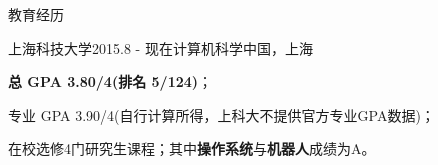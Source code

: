 \documentclass{resume} %
\begin{document}

\begin{rSection}{教育经历}

\begin{rSubsection}
  {上海科技大学}{2015.8 - 现在}{计算机科学}{中国，上海}
    \item \textbf{总 GPA 3.80/4(排名 5/124)}；
    \item 专业 GPA 3.90/4(自行计算所得，上科大不提供官方专业GPA数据)；
    \item 在校选修4门研究生课程；其中\textbf{操作系统}与\textbf{机器人}成绩为A。
\end{rSubsection}

\end{rSection}
\end{document}
